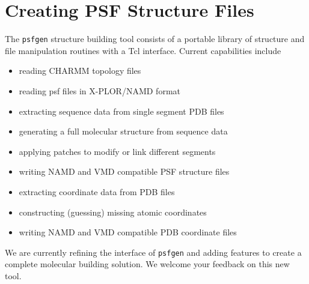 
%
%
%

\section{Creating PSF Structure Files}
\label{section:psfgen}

The \verb#psfgen# structure building tool consists of a portable library
of structure and file manipulation routines with a Tcl interface.
Current capabilities include
\begin{itemize}
\item reading CHARMM topology files
\item reading psf files in X-PLOR/NAMD format
\item extracting sequence data from single segment PDB files
\item generating a full molecular structure from sequence data
\item applying patches to modify or link different segments
\item writing NAMD and VMD compatible PSF structure files
\item extracting coordinate data from PDB files
\item constructing (guessing) missing atomic coordinates
\item writing NAMD and VMD compatible PDB coordinate files
\end{itemize}

We are currently refining the interface of \verb#psfgen# and adding
features to create a complete molecular building solution.
We welcome your feedback on this new tool.

